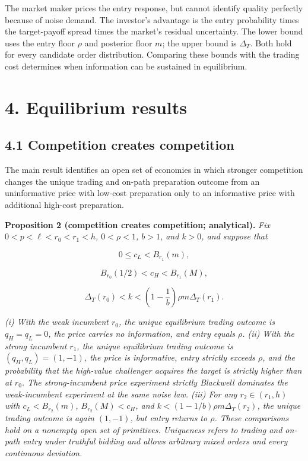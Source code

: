 \documentclass[
  12pt,
]{article}
\begin{document}
The market maker prices the entry response, but cannot identify quality
perfectly because of noise demand. The investor's advantage is the entry
probability times the target-payoff spread times the market's residual
uncertainty. The lower bound uses the entry floor \(\rho\) and posterior
floor \(m\); the upper bound is \(\Delta_T\). Both hold for every
candidate order distribution. Comparing these bounds with the trading
cost determines when information can be sustained in equilibrium.

\section{4. Equilibrium results}\label{sec-results}

\subsection{4.1 Competition creates
competition}\label{sec-competition-creates-competition}

The main result identifies an open set of economies in which stronger
competition changes the unique trading and on-path preparation outcome
from an uninformative price with low-cost preparation only to an
informative price with additional high-cost preparation.


\protect{}\label{result-proposition-2}{\textbf{Proposition
2 (competition creates competition; analytical).}} \emph{Fix
\(0<p<\ell<r_0<r_1<h\), \(0<\rho<1\), \(b>1\), and \(k>0\), and suppose
that}

\[
0\le c_L<B_{r_1}(m),
\tag{A1}\label{eq:paper-a1}
\]

\[
B_{r_0}(1/2)<c_H<B_{r_1}(M),
\tag{A2}\label{eq:paper-a2}
\]

\[
\Delta_T(r_0)<k<\left(1-\frac1b\right)\rho m\Delta_T(r_1).
\tag{A3}\label{eq:paper-a3}
\]

\emph{(i) With the weak incumbent \(r_0\), the unique equilibrium
trading outcome is \(q_H=q_L=0\), the price carries no information, and
entry equals \(\rho\). (ii) With the strong incumbent \(r_1\), the
unique equilibrium trading outcome is \((q_H,q_L)=(1,-1)\), the price is
informative, entry strictly exceeds \(\rho\), and the probability that
the high-value challenger acquires the target is strictly higher than at
\(r_0\). The strong-incumbent price experiment strictly Blackwell
dominates the weak-incumbent experiment at the same noise law. (iii) For
any \(r_2\in(r_1,h)\) with \(c_L<B_{r_2}(m)\), \(B_{r_2}(M)<c_H\), and
\(k<(1-1/b)\rho m\Delta_T(r_2)\), the unique trading outcome is again
\((1,-1)\), but entry returns to \(\rho\). These comparisons hold on a
nonempty open set of primitives. Uniqueness refers to trading and
on-path entry under truthful bidding and allows arbitrary mixed orders
and every continuous deviation.}
\end{document}

